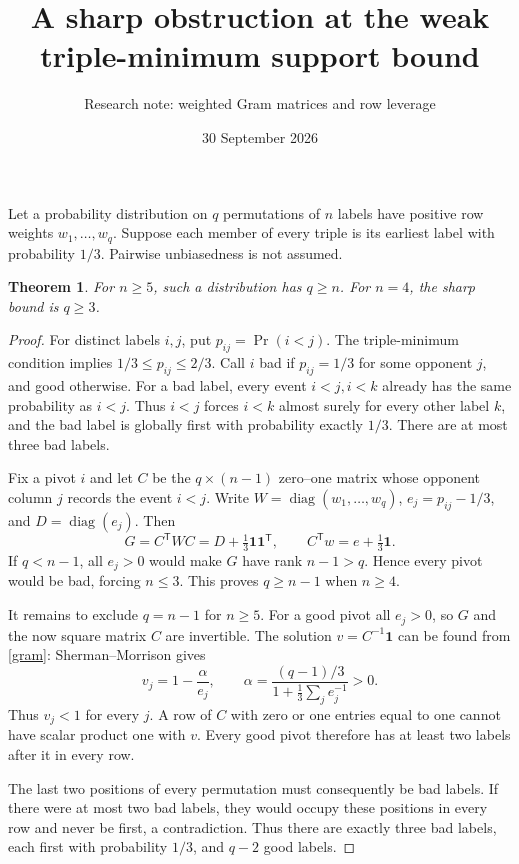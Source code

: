 \documentclass[11pt]{article}
\title{A sharp obstruction at the weak triple-minimum support bound}
\author{Research note: weighted Gram matrices and row leverage}
\date{30 September 2026}
\newtheorem{theorem}{Theorem}
\begin{document}
\maketitle

Let a probability distribution on $q$ permutations of $n$ labels have
positive row weights $w_1,\ldots,w_q$. Suppose each member of every
triple is its earliest label with probability $1/3$. Pairwise
unbiasedness is not assumed.

\begin{theorem}\label{support}
For $n\ge5$, such a distribution has $q\ge n$.
For $n=4$, the sharp bound is $q\ge3$.
\end{theorem}
\begin{proof}
For distinct labels $i,j$, put $p_{ij}=\Pr(i<j)$. The triple-minimum
condition implies $1/3\le p_{ij}\le2/3$.
Call $i$ bad if $p_{ij}=1/3$ for some opponent $j$, and good otherwise.
For a bad label, every event $i<j,i<k$ already has the same probability
as $i<j$. Thus $i<j$ forces $i<k$ almost surely for every other label
$k$, and the bad label is globally first with probability exactly
$1/3$. There are at most three bad labels.

Fix a pivot $i$ and let $C$ be the $q\times(n-1)$ zero--one matrix
whose opponent column $j$ records the event $i<j$. Write
$W=\operatorname{diag}(w_1,\ldots,w_q)$, $e_j=p_{ij}-1/3$, and
$D=\operatorname{diag}(e_j)$. Then
\begin{equation}\label{gram}
 G=C^{\mathsf T}WC=D+\tfrac13\mathbf1\mathbf1^{\mathsf T},
 \qquad C^{\mathsf T}w=e+\tfrac13\mathbf1.
\end{equation}
If $q<n-1$, all $e_j>0$ would make $G$ have rank $n-1>q$.
Hence every pivot would be bad, forcing $n\le3$. This proves
$q\ge n-1$ when $n\ge4$.

It remains to exclude $q=n-1$ for $n\ge5$. For a good pivot all
$e_j>0$, so $G$ and the now square matrix $C$ are invertible.
The solution $v=C^{-1}\mathbf1$ can be found from \eqref{gram}:
Sherman--Morrison gives
\begin{equation}\label{v}
 v_j=1-\frac{\alpha}{e_j},\qquad
 \alpha=\frac{(q-1)/3}{1+\frac13\sum_j e_j^{-1}}>0.
\end{equation}
Thus $v_j<1$ for every $j$. A row of $C$ with zero or one entries
equal to one cannot have scalar product one with $v$. Every good
pivot therefore has at least two labels after it in every row.

The last two positions of every permutation must consequently be
bad labels. If there were at most two bad labels, they would occupy
these positions in every row and never be first, a contradiction.
Thus there are exactly three bad labels, each first with probability
$1/3$, and $q-2$ good labels.


\end{proof}
\end{document}
